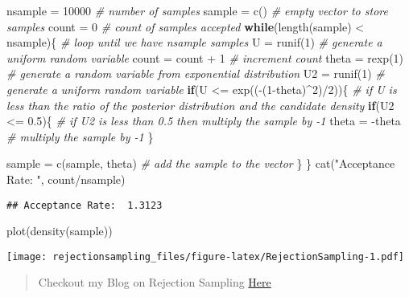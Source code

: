 \documentclass[
]{article}
\newenvironment{Shaded}{\begin{snugshade}}{\end{snugshade}}
\newcommand{\CommentTok}[1]{\textcolor[rgb]{0.56,0.35,0.01}{\textit{#1}}}
\newcommand{\ControlFlowTok}[1]{\textcolor[rgb]{0.13,0.29,0.53}{\textbf{#1}}}
\newcommand{\DecValTok}[1]{\textcolor[rgb]{0.00,0.00,0.81}{#1}}
\newcommand{\FloatTok}[1]{\textcolor[rgb]{0.00,0.00,0.81}{#1}}
\newcommand{\FunctionTok}[1]{\textcolor[rgb]{0.00,0.00,0.00}{#1}}
\newcommand{\NormalTok}[1]{#1}
\newcommand{\OtherTok}[1]{\textcolor[rgb]{0.56,0.35,0.01}{#1}}
\newcommand{\SpecialCharTok}[1]{\textcolor[rgb]{0.00,0.00,0.00}{#1}}
\newcommand{\StringTok}[1]{\textcolor[rgb]{0.31,0.60,0.02}{#1}}
\begin{document}
\begin{Shaded}
\begin{Highlighting}[]
\NormalTok{nsample }\OtherTok{=} \DecValTok{10000}                     \CommentTok{\# number of samples}
\NormalTok{sample }\OtherTok{=} \FunctionTok{c}\NormalTok{()                        }\CommentTok{\# empty vector to store samples}
\NormalTok{count }\OtherTok{=} \DecValTok{0}                           \CommentTok{\# count of samples accepted}
\ControlFlowTok{while}\NormalTok{(}\FunctionTok{length}\NormalTok{(sample) }\SpecialCharTok{\textless{}}\NormalTok{ nsample)\{    }\CommentTok{\# loop until we have nsample samples}
\NormalTok{  U }\OtherTok{=} \FunctionTok{runif}\NormalTok{(}\DecValTok{1}\NormalTok{)                      }\CommentTok{\# generate a uniform random variable}
\NormalTok{  count }\OtherTok{=}\NormalTok{ count }\SpecialCharTok{+} \DecValTok{1}                 \CommentTok{\# increment count}
\NormalTok{  theta }\OtherTok{=} \FunctionTok{rexp}\NormalTok{(}\DecValTok{1}\NormalTok{)                   }\CommentTok{\# generate a random variable from exponential distribution}
\NormalTok{  U2 }\OtherTok{=} \FunctionTok{runif}\NormalTok{(}\DecValTok{1}\NormalTok{)                     }\CommentTok{\# generate a uniform random variable}
  \ControlFlowTok{if}\NormalTok{(U }\SpecialCharTok{\textless{}=} \FunctionTok{exp}\NormalTok{((}\SpecialCharTok{{-}}\NormalTok{(}\DecValTok{1}\SpecialCharTok{{-}}\NormalTok{theta)}\SpecialCharTok{\^{}}\DecValTok{2}\NormalTok{)}\SpecialCharTok{/}\DecValTok{2}\NormalTok{))\{ }\CommentTok{\# if U is less than the ratio of the posterior distribution and the candidate density}
    \ControlFlowTok{if}\NormalTok{(U2 }\SpecialCharTok{\textless{}=} \FloatTok{0.5}\NormalTok{)\{                  }\CommentTok{\# if U2 is less than 0.5 then multiply the sample by {-}1}
\NormalTok{      theta }\OtherTok{=} \SpecialCharTok{{-}}\NormalTok{theta                }\CommentTok{\# multiply the sample by {-}1}
\NormalTok{    \}}
    
\NormalTok{    sample }\OtherTok{=} \FunctionTok{c}\NormalTok{(sample, theta)       }\CommentTok{\# add the sample to the vector}
\NormalTok{  \}}
\NormalTok{\}}
\FunctionTok{cat}\NormalTok{(}\StringTok{"Acceptance Rate: "}\NormalTok{, count}\SpecialCharTok{/}\NormalTok{nsample)}
\end{Highlighting}
\end{Shaded}

\begin{verbatim}
## Acceptance Rate:  1.3123
\end{verbatim}

\begin{Shaded}
\begin{Highlighting}[]
\FunctionTok{plot}\NormalTok{(}\FunctionTok{density}\NormalTok{(sample))}
\end{Highlighting}
\end{Shaded}

\texttt{[image: rejectionsampling\_files/figure-latex/RejectionSampling-1.pdf]}

\begin{quote}
Checkout my Blog on Rejection Sampling \href{www.iroblack.com}{Here}
\end{quote}
\end{document}
